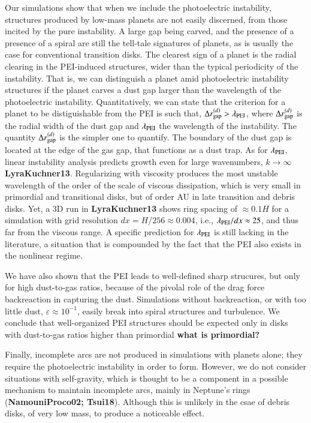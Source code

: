\documentclass[onecolumn]{report}
\newcommand{\epsi}{\varepsilon}
\begin{document}
Our simulations show that when we include the photoelectric instability, structures produced by low-mass planets are not easily discerned, from those incited by the pure instability. A large gap being carved, and the presence of a presence of a spiral are still the tell-tale signatures of planets, as is usually the case for conventional transition disks. The clearest sign of a planet is the radial clearing in the PEI-induced structures, wider than the typical periodicity of the instability. That is, we can distinguish a planet amid photoelectric instability structures if the planet carves a dust gap larger than the wavelength of the photoelectric instability. Quantitatively, we can state that the criterion for a planet to be distiguishable from the PEI is such that, $\Delta r^{(d)}_{\rm gap} > \lambda_{\rm PEI}$, where $\Delta r^{(d)}_{\rm gap}$ is the radial width of the dust gap and $\lambda_{\rm PEI}$ the wavelength of the instability. The quantity $\Delta r^{(d)}_{\rm gap}$ is the simpler one to quantify. The boundary of the dust gap is located at the edge of the gas gap, that functions as a dust trap. As for $\lambda_{\rm PEI}$, linear instability analysis predicts growth even for large wavenumbers, $k\rightarrow\infty$ \textbf{LyraKuchner13}. Regularizing with viscosity produces the most unstable wavelength of the order of the scale of viscous dissipation, which is very small in primordial and transitional disks, but of order AU in late transition and debris disks. Yet, a 3D run in \textbf{LyraKuchner13} shows ring spacing of $\approx 0.1H$ for a simulation with grid resolution $dx=H/256 \approx 0.004$, i.e., $\lambda_{\rm PEI}/dx \approx 25$, and thus far from the viscous range. A specific prediction for $\lambda_{\rm PEI}$ is still lacking in the literature, a situation that is compounded by the fact that the PEI also exists in the nonlinear regime.

We have also shown that the PEI leads to well-defined sharp strucures, but only for high dust-to-gas ratios, because of the pivolal role of the drag force backreaction in capturing the dust. Simulations without backreaction, or with too little dust, $\epsi \approx 10^{-1}$, easily break into spiral structures and turbulence. We conclude that well-organized PEI structures should be expected only in disks with dust-to-gas ratios higher than primordial \textbf{what is primordial?}

Finally, incomplete arcs are not produced in simulations with planets alone; they require the photoelectric instability in order to form. However, we do not consider situations with self-gravity, which is thought to be a component in a possible mechanism to maintain incomplete arcs, mainly in Neptune's rings (\textbf{NamouniProco02; Tsui18}). Although this is unlikely in the csae of debris disks, of very low mass, to produce a noticeable effect.
\end{document}
